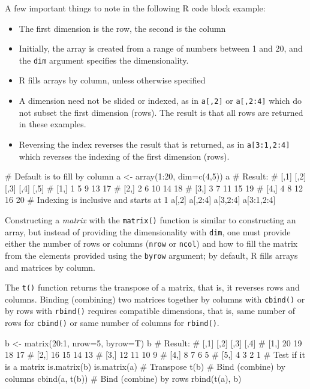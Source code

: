 A few important things to note in the following R code block example:
\begin{itemize}
   \item The first dimension is the row, the second is the column
   \item Initially, the array is created from a range of numbers between 1 and 20, and the \texttt{dim} argument specifies the dimensionality. 
   \item R fills arrays by column, unless otherwise specified
   \item A dimension need not be slided or indexed, as in \texttt{a[,2]} or \texttt{a[,2:4]} which do not subset the first dimension (rows). The result is that all rows are returned in these examples. 
   \item Reversing the index reverses the result that is returned, as in \texttt{a[3:1,2:4]} which reverses the indexing of the first dimension (rows). 
\end{itemize}

\begin{samepage}
\begin{Rcode}
# Default is to fill by column
a <- array(1:20, dim=c(4,5))
a
# Result:
#      [,1] [,2] [,3] [,4] [,5]
# [1,]    1    5    9   13   17
# [2,]    2    6   10   14   18
# [3,]    3    7   11   15   19
# [4,]    4    8   12   16   20
# Indexing is inclusive and starts at 1
a[,2]
a[,2:4]
a[3,2:4]
a[3:1,2:4]
\end{Rcode}
\end{samepage}

Constructing a \emph{matrix} with the \texttt{matrix()} function is similar to constructing an array, but instead of providing the dimensionality with \texttt{dim}, one must provide either the number of rows or columns (\texttt{nrow} or \texttt{ncol}) and how to fill the matrix from the elements provided using the \texttt{byrow} argument; by default, R fills arrays and matrices by column. 

The \texttt{t()} function returns the transpose of a matrix, that is, it reverses rows and columns. Binding (combining) two matrices together by columns with \texttt{cbind()} or by rows with \texttt{rbind()} requires compatible dimensions, that is, same number of rows for \texttt{cbind()} or same number of columns for \texttt{rbind()}.

\begin{samepage}
\begin{Rcode}
b <- matrix(20:1, nrow=5, byrow=T)
b
# Result:
#      [,1] [,2] [,3] [,4]
# [1,]   20   19   18   17
# [2,]   16   15   14   13
# [3,]   12   11   10    9
# [4,]    8    7    6    5
# [5,]    4    3    2    1
# Test if it is a matrix
is.matrix(b)
is.matrix(a)
# Transpose
t(b)
# Bind (combine) by columns
cbind(a, t(b))
# Bind (combine) by rows
rbind(t(a), b)
\end{Rcode}
\end{samepage}

